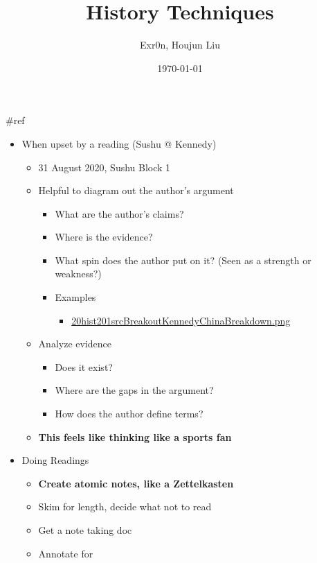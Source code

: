 \documentclass[letterpaper]{article}
\author{Exr0n, Houjun Liu}
\date{\today}
\title{History Techniques}
\renewcommand\maketitle{}
\begin{document}
\maketitle
\#ref

\begin{itemize}
\item When upset by a reading (Sushu @ Kennedy)

\begin{itemize}
\item 31 August 2020, Sushu Block 1
\item Helpful to diagram out the author's argument

\begin{itemize}
\item What are the author's claims?
\item Where is the evidence?
\item What spin does the author put on it? (Seen as a strength or
weakness?)
\item Examples

\begin{itemize}
\item \href{20hist201srcBreakoutKennedyChinaBreakdown.png.org}{20hist201srcBreakoutKennedyChinaBreakdown.png}
\end{itemize}
\end{itemize}

\item Analyze evidence

\begin{itemize}
\item Does it exist?
\item Where are the gaps in the argument?
\item How does the author define terms?
\end{itemize}

\item \textbf{This feels like thinking like a sports fan}
\end{itemize}

\item Doing Readings

\begin{itemize}
\item \textbf{Create atomic notes, like a Zettelkasten}

\item Skim for length, decide what not to read
\item Get a note taking doc
\item Annotate for


\end{itemize}
\end{itemize}
\end{document}
